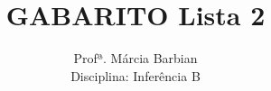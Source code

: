 \documentclass[10pt,brazil,addpoints]{exam}
\begin{document}
\title{GABARITO Lista 2}


\author{
  Profª. Márcia Barbian \\
  Disciplina: Inferência B\\
  \date{}
}


\maketitle
\end{document}
